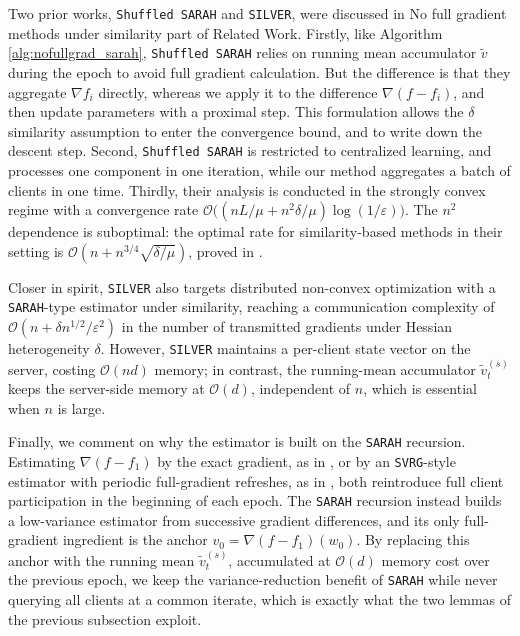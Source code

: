 \documentclass{article}
\begin{document}
Two prior works, \texttt{Shuffled SARAH} and \texttt{SILVER},  were discussed in No full gradient methods under similarity part of Related Work. Firstly, like Algorithm \ref{alg:nofullgrad_sarah}, \texttt{Shuffled SARAH} relies on running mean accumulator $\tilde v$ during the epoch to avoid full gradient calculation. But the difference is that they aggregate $\nabla f_{i}$ directly, whereas we apply it to the difference $\nabla(f-f_i)$, and then update parameters with a proximal step. This formulation allows the $\delta$ similarity assumption to enter the convergence bound, and to write down the descent step. 
Second, \texttt{Shuffled SARAH} is restricted to centralized learning, and processes one component in one iteration, while our method aggregates a batch of clients in one time. Thirdly, their analysis is conducted in the strongly convex regime with a convergence rate $\mathcal{O}\bigl((nL/\mu + n^{2}\delta/\mu)\log(1/\varepsilon)\bigr)$. The $n^2$ dependence is suboptimal: the optimal rate for similarity-based methods in their setting is $\mathcal{O}(n + n^{3/4}\sqrt{\delta/\mu})$, proved in \cite{lin2023stochastic}. 

Closer in spirit, \texttt{SILVER} \cite{oko2024silver} also targets 
distributed non-convex optimization with a \texttt{SARAH}-type 
estimator under similarity, reaching a communication complexity of 
$\mathcal{O}(n + \delta n^{1/2}/\varepsilon^2)$ in the number of 
transmitted gradients under Hessian heterogeneity $\delta$. However, \texttt{SILVER} 
maintains a per-client state vector on the server, costing 
$\mathcal{O}(nd)$ memory; in contrast, the running-mean accumulator 
$\tilde v_t^{(s)}$ keeps the server-side memory at $\mathcal{O}(d)$, 
independent of $n$, which is essential when $n$ is large.

Finally, we comment on why the estimator is built on the \texttt{SARAH} recursion. Estimating $\nabla(f - f_1)$ by the exact gradient, as in \cite{kovalev2022optimal, sun2022distributed}, or by an \texttt{SVRG}-style estimator with periodic full-gradient refreshes, as in \cite{khaled2022faster, lin2023stochastic}, both reintroduce full client participation in the beginning of each epoch. The \texttt{SARAH} recursion instead builds a low-variance estimator from successive gradient differences, and its only full-gradient ingredient is the anchor $v_0 = \nabla(f - f_1)(w_0)$. By replacing this anchor with the running mean $\tilde v_t^{(s)}$, accumulated at $\mathcal{O}(d)$ memory cost over the previous epoch, we keep the variance-reduction benefit of \texttt{SARAH} while never querying all clients at a common iterate, which is exactly what the two lemmas of the previous subsection exploit. 
\end{document}

